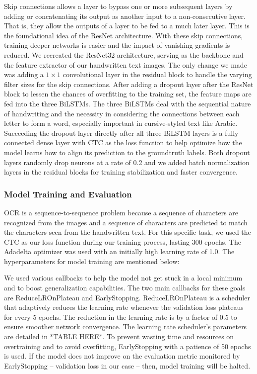 \documentclass[conference]{IEEEtran}
\begin{document}
Skip connections allows a layer to bypass one or more subsequent layers by adding or concatenating its output as another input to a non-consecutive layer. That is, they allow the outputs of a layer to be fed to a much later layer. This is the foundational idea of the ResNet architecture. With these skip connections, training deeper networks is easier and the impact of vanishing gradients is reduced. We recreated the ResNet32 architecture, serving as the backbone and the feature extractor of our handwritten text images. The only change we made was adding a \( 1 \times 1 \) convolutional layer in the residual block to handle the varying filter sizes for the skip connections. After adding a dropout layer after the ResNet block to lessen the chances of overfitting to the training set, the feature maps are fed into the three BiLSTMs. The three BiLSTMs deal with the sequential nature of handwriting and the necessity in considering the connections between each letter to form a word, especially important in cursive-styled text like Arabic. Succeeding the dropout layer directly after all three BiLSTM layers is a fully connected dense layer with CTC as the loss function to help optimize how the model learns how to align its prediction to the groundtruth labels. Both dropout layers randomly drop neurons at a rate of 0.2 and we added batch normalization layers in the residual blocks for training stabilization and faster convergence.

\subsubsection{Model Training and Evaluation}

OCR is a sequence-to-sequence problem because a sequence of characters are recognized from the images and a sequence of characters are predicted to match the characters seen from the handwritten text. For this specific task, we used the CTC as our loss function during our training process, lasting 300 epochs. The Adadelta optimizer was used with an initially high learning rate of 1.0. The hyperparameters for model training are mentioned below:

We used various callbacks to help the model not get stuck in a local minimum and to boost generalization capabilities. The two main callbacks for these goals are ReduceLROnPlateau and EarlyStopping. ReduceLROnPlateau is a scheduler that adaptively reduces the learning rate whenever the validation loss plateaus for every 5 epochs. The reduction in the learning rate is by a factor of 0.5 to ensure smoother network convergence. The learning rate scheduler's parameters are detailed in *TABLE HERE*. To prevent wasting time and resources on overtraining and to avoid overfitting, EarlyStopping with a patience of 50 epochs is used. If the model does not improve on the evaluation metric monitored by EarlyStopping -- validation loss in our case -- then, model training will be halted.
\end{document}
